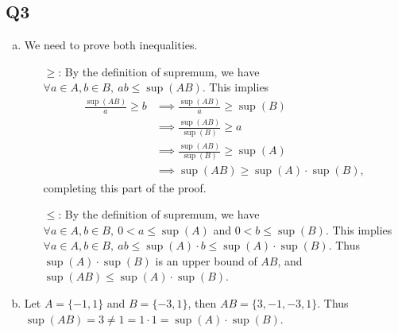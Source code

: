 \documentclass[12pt,lettersize]{article}
\begin{document}
\subsection*{Q3}
\begin{enumerate}[(a)]
	\item We need to prove both inequalities.
	\begin{itemize}
		\item[$\geq$:] By the definition of supremum, we have $\forall a\in A, b\in B,\ ab\leq\sup(AB)$. This implies
		\begin{align*}
			\frac{\sup(AB)}{a}\geq b &\implies \frac{\sup(AB)}{a}\geq\sup(B)\\
									 &\implies \frac{\sup(AB)}{\sup(B)}\geq a\\
									 &\implies \frac{\sup(AB)}{\sup(B)}\geq \sup(A)\\
									 &\implies \sup(AB)\geq \sup(A)\cdot\sup(B),
		\end{align*}
		completing this part of the proof.
		\item[$\leq$:] By the definition of supremum, we have $\forall a\in A, b\in B,\ 0<a\leq\sup(A)$ and $0<b\leq\sup (B)$. This implies $\forall a\in A, b\in B,\ ab\leq\sup (A)\cdot b\leq \sup (A)\cdot\sup (B)$. Thus $\sup (A)\cdot\sup (B)$ is an upper bound of $AB$, and $\sup(AB)\leq\sup (A)\cdot\sup (B)$.
	\end{itemize}
	\item Let $A=\{-1,1\}$ and $B=\{-3,1\}$, then $AB=\{3,-1,-3,1\}$. Thus $\sup(AB)=3\neq1=1\cdot1=\sup(A)\cdot\sup(B)$.
\end{enumerate}

\newpage
\end{document}

